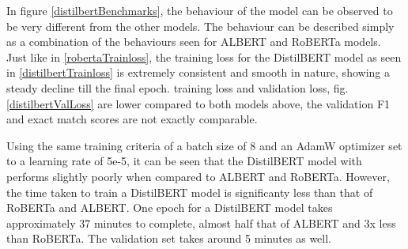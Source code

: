 \documentclass[a4paper,12pt]{report}
\begin{document}
	In figure \ref{distilbertBenchmarks}, the behaviour of the model can be observed to be very different from the other models. The behaviour can be described simply as a combination of the behaviours seen for ALBERT and RoBERTa models. Just like in \ref{robertaTrainloss}, the training loss for the DistilBERT model as seen in \ref{distilbertTrainloss} is extremely consistent and smooth in nature, showing a steady decline till the final epoch. training loss and validation loss, fig. \ref{distilbertValLoss} are lower compared to both models above, the validation F1 and exact match scores are not exactly comparable.

	Using the same training criteria of a batch size of 8 and an AdamW optimizer set to a learning rate of 5e-5, it can be seen that the DistilBERT model with performs slightly poorly when compared to ALBERT and RoBERTa. However, the time taken to train a DistilBERT model is significanty less than that of RoBERTa and ALBERT. One epoch for a DistilBERT model takes approximately 37 minutes to complete, almost half that of ALBERT and 3x less than RoBERTa. The validation set takes around 5 minutes as well.
\end{document}
